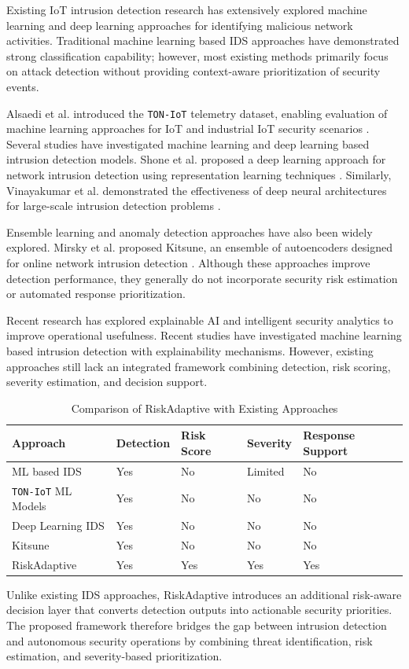 Existing IoT intrusion detection research has extensively explored
machine learning and deep learning approaches for identifying malicious
network activities. Traditional machine learning based IDS approaches
have demonstrated strong classification capability; however, most
existing methods primarily focus on attack detection without providing
context-aware prioritization of security events.

Alsaedi et al. introduced the \texttt{TON-IoT} telemetry dataset, enabling
evaluation of machine learning approaches for IoT and industrial IoT
security scenarios \cite{alsaeedi2020toniot}. Several studies have
investigated machine learning and deep learning based intrusion
detection models. Shone et al. proposed a deep learning approach for
network intrusion detection using representation learning techniques
\cite{shone2018deep}. Similarly, Vinayakumar et al. demonstrated the
effectiveness of deep neural architectures for large-scale intrusion
detection problems \cite{vinayakumar2019deep}.

Ensemble learning and anomaly detection approaches have also been
widely explored. Mirsky et al. proposed Kitsune, an ensemble of
autoencoders designed for online network intrusion detection
\cite{mirsky2018kitsune}. Although these approaches improve detection
performance, they generally do not incorporate security risk estimation
or automated response prioritization.

Recent research has explored explainable AI and intelligent security
analytics to improve operational usefulness. Recent studies have investigated
machine learning based intrusion detection with explainability
mechanisms. However, existing approaches
still lack an integrated framework combining detection, risk scoring,
severity estimation, and decision support.

\begin{table}[H]
\caption{Comparison of RiskAdaptive with Existing Approaches}
\centering
\begin{tabular}{p{2cm}p{1.3cm}p{1.3cm}p{1.3cm}p{1.3cm}}
\toprule
\textbf{Approach} & 
\textbf{Detection} &
\textbf{Risk Score} &
\textbf{Severity} &
\textbf{Response Support}\\
\midrule
ML based IDS \cite{ahmed2016survey} & Yes & No & Limited & No\\
\texttt{TON-IoT} ML Models \cite{alsaeedi2020toniot} & Yes & No & No & No\\
Deep Learning IDS \cite{vinayakumar2019deep} & Yes & No & No & No\\
Kitsune \cite{mirsky2018kitsune} & Yes & No & No & No\\
RiskAdaptive & Yes & Yes & Yes & Yes\\
\bottomrule
\end{tabular}
\end{table}


Unlike existing IDS approaches, RiskAdaptive introduces an additional
risk-aware decision layer that converts detection outputs into
actionable security priorities. The proposed framework therefore
bridges the gap between intrusion detection and autonomous security
operations by combining threat identification, risk estimation, and
severity-based prioritization.
